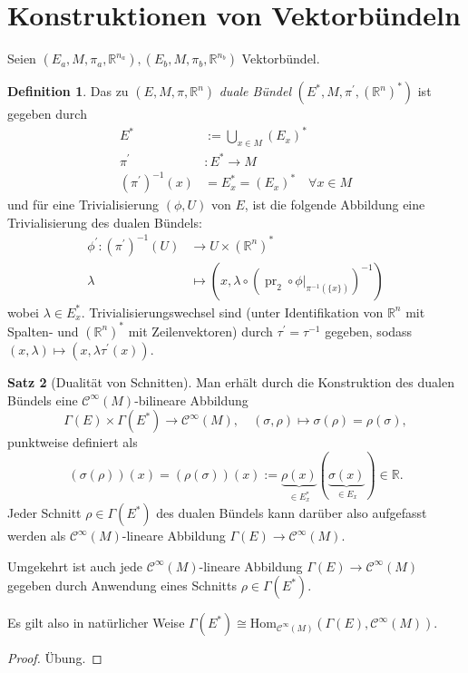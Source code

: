 \documentclass[a4paper]{scrreprt}
\numberwithin{equation}{chapter}
\DeclareMathOperator{\pr}{pr}
\newcommand{\R}{\mathbb{R}}
\newcommand{\sC}{\mathcal{C}^{\infty}}
\theoremstyle{definition}
\newtheorem{defn}{Definition}[section]
\newtheorem{satz}[defn]{Satz}
\newcommand{\bewUeb}{\begin{proof}Übung.\end{proof}}
\begin{document}
	\section{Konstruktionen von Vektorbündeln}
		Seien $(E_a,M,\pi_a,\R^{n_a}),(E_b,M,\pi_b,\R^{n_b})$ Vektorbündel.\\
		\begin{defn}
			Das zu $(E,M,\pi,\R^{n})$ \emph{duale Bündel} $(E^*,M,\pi^{\prime},(\R^n)^*)$ ist gegeben durch
			\begin{align*}
				E^*&:=\bigcup_{x\in M}(E_{x})^*\\
				\pi^{\prime}&\colon E^*\rightarrow M\\
				(\pi^{\prime})^{-1}(x)&=E^*_x=(E_{x})^*\quad \forall x\in M
			\end{align*}
			und für eine Trivialisierung $(\phi,U)$ von $E$, ist die folgende Abbildung eine Trivialisierung des dualen Bündels:
			\begin{align*}
				\phi^{\prime}\colon(\pi^{\prime})^{-1}(U)&\rightarrow U\times (\R^n)^*\\
				\lambda&\mapsto\left(x,\lambda\circ({\pr_2}\circ\phi\vert_{\pi^{-1}(\lbrace x\rbrace)})^{-1}\right)
			\end{align*}
			wobei $\lambda\in E_x^*$. Trivialisierungswechsel sind (unter Identifikation von $\R^n$ mit Spalten- und $(\R^n)^*$ mit Zeilenvektoren) durch $\tau^{\prime}=\tau^{-1}$ gegeben, sodass $(x,\lambda)\mapsto(x,\lambda\tau^{\prime}(x))$.
		\end{defn}
		
		\begin{satz}[Dualität von Schnitten]\label{satz:Dualität}
			Man erhält durch die Konstruktion des dualen Bündels eine $\sC(M)$-bilineare Abbildung
			\[\Gamma(E)\times\Gamma(E^*)\rightarrow \sC(M),\quad (\sigma,\rho)\mapsto \sigma(\rho)=\rho(\sigma),\]
			punktweise definiert als
			\[(\sigma(\rho))(x)=(\rho(\sigma))(x):=\underbrace{\rho(x)}_{\in E^*_x}(\underbrace{\sigma(x)}_{\in E_x})\in \R.\]
			Jeder Schnitt $\rho \in \Gamma(E^*)$ des dualen Bündels kann darüber also aufgefasst werden als $\sC(M)$-lineare Abbildung $\Gamma(E) \to \sC(M)$.
			
			Umgekehrt ist auch jede $\sC(M)$-lineare Abbildung $\Gamma(E) \to \sC(M)$ gegeben durch Anwendung eines Schnitts $\rho \in \Gamma(E^*)$.
			
			Es gilt also in natürlicher Weise $\Gamma(E^*)\cong \mathrm{Hom}_{\sC(M)}(\Gamma(E),\sC(M))$. 
			\bewUeb
		\end{satz}
	
\end{document}
